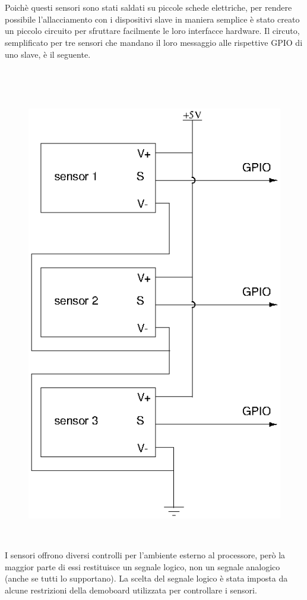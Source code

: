 \documentclass[a4paper,titlepage]{book}
\begin{document}
~

~

Poichè questi sensori sono stati saldati su piccole schede elettriche, per rendere possibile l'allacciamento con i dispositivi slave in maniera semplice è stato creato un piccolo circuito per sfruttare facilmente le loro interfacce hardware.
Il circuto, semplificato per tre sensori che mandano il loro messaggio alle rispettive GPIO di uno slave, è il seguente.

~

~

\begin{figure}[!h]
\centering
\includegraphics[scale=0.5]{circuitSensor.png}
\end{figure}


~

I sensori offrono diversi controlli per l'ambiente esterno al processore, però la maggior parte di essi restituisce un segnale logico, non un segnale analogico (anche se tutti lo supportano). La scelta del segnale logico è stata imposta da alcune restrizioni della demoboard utilizzata per controllare i sensori.
\end{document}
